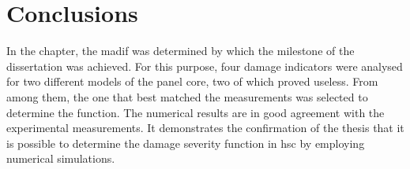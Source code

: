 \section{Conclusions}
\label{sec:conclusionsSever}

In the chapter, the \ac{madif} was determined by which the milestone of the dissertation was achieved.
For this purpose, four damage indicators were analysed for two different models of the panel core, two of which proved useless.
From among them, the one that best matched the measurements was selected to determine the function.
The numerical results are in good agreement with the experimental measurements.
It demonstrates the confirmation of the thesis that it is possible to determine the damage severity function in \ac{hsc} by employing numerical simulations.